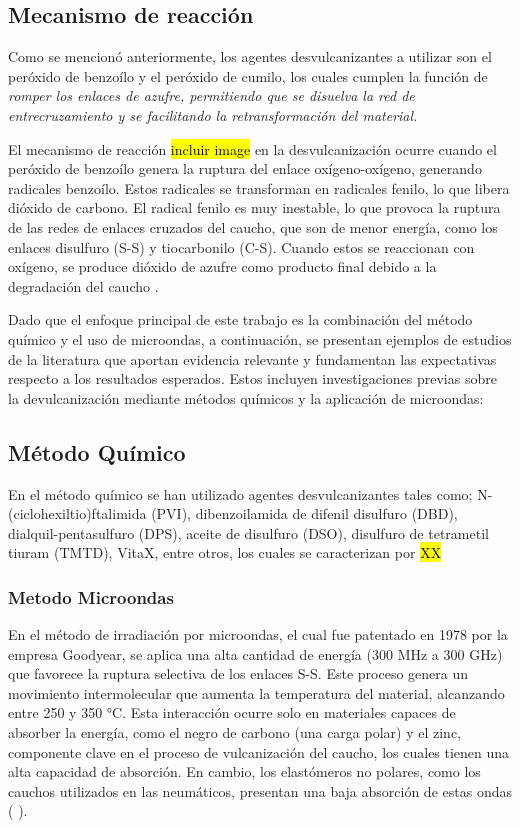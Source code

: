 \begin{multicols}{2}
\subsection{\textbf{\large{Mecanismo de reacción}}}

Como se mencionó anteriormente, los agentes desvulcanizantes a utilizar son el peróxido de benzoílo y el peróxido de cumilo, los cuales cumplen la función de \textit{romper los enlaces de azufre, permitiendo que se disuelva la red de entrecruzamiento y se facilitando la retransformación del material.}

El mecanismo de reacción \hl{incluir image} en la  desvulcanización ocurre cuando el peróxido de benzoílo genera la ruptura del enlace oxígeno-oxígeno, generando radicales benzoílo. Estos radicales se transforman en radicales fenilo, lo que libera dióxido de carbono. El radical fenilo es muy inestable, lo que provoca la ruptura de las redes de enlaces cruzados del caucho, que son de menor energía, como los enlaces disulfuro (S-S) y tiocarbonilo (C-S). Cuando estos se reaccionan con oxígeno, se produce dióxido de azufre como producto final debido a la degradación del caucho \cite{Rooj2011}.

Dado que el enfoque principal de este trabajo es la combinación del método químico y el uso de microondas, a continuación, se presentan ejemplos de estudios de la literatura que aportan evidencia relevante y fundamentan las expectativas respecto a los resultados esperados. Estos incluyen investigaciones previas sobre la devulcanización mediante métodos químicos y la aplicación de microondas:

\subsection{\textbf{\large{Método Químico}}}

En el método químico se han utilizado agentes desvulcanizantes tales como; N-(ciclohexiltio)ftalimida (PVI),  dibenzoilamida de difenil disulfuro (DBD),  dialquil-pentasulfuro (DPS), aceite de disulfuro (DSO), disulfuro de tetrametil tiuram (TMTD), VitaX, entre otros, los cuales se caracterizan por \hl{XX} 

\subsubsection{\textbf{\large{Metodo Microondas}}}

En el método de irradiación por microondas, el cual fue patentado en 1978 por la empresa Goodyear, se aplica una alta cantidad de energía (300 MHz a 300 GHz) que favorece la ruptura selectiva de los enlaces S-S. Este proceso genera un movimiento intermolecular que aumenta la temperatura del material, alcanzando entre 250 y 350 °C. Esta interacción ocurre solo en materiales capaces de absorber la energía, %
como el negro de carbono (una carga polar) y el zinc, componente clave en el proceso de vulcanización del caucho, los cuales tienen una alta capacidad de absorción. En cambio, los elastómeros no polares, como los cauchos utilizados en las neumáticos, presentan una baja absorción de estas ondas (\cite{Dorigato2023} \cite{Garcia2015}).


\end{multicols}
